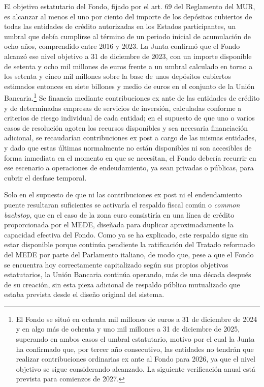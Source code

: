 \documentclass[10pt,a4paper]{article}
\begin{document}
{El objetivo estatutario del Fondo, fijado por el art. $69$ del Reglamento del MUR, es alcanzar al menos el uno por ciento del importe de los depósitos cubiertos de todas las entidades de crédito autorizadas en los Estados participantes, un umbral que debía cumplirse al término de un periodo inicial de acumulación de ocho años, comprendido entre 2016 y 2023. La Junta confirmó que el Fondo alcanzó ese nivel objetivo a 31 de diciembre de 2023, con un importe disponible de setenta y ocho mil millones de euros frente a un umbral calculado en torno a los setenta y cinco mil millones sobre la base de unos depósitos cubiertos estimados entonces en siete billones y medio de euros en el conjunto de la Unión Bancaria.\footnote{%
    El Fondo se situó en ochenta mil millones de euros a 31 de diciembre de 2024 y en algo más de ochenta y uno mil millones a 31 de diciembre de 2025, superando en ambos casos el umbral estatutario, motivo por el cual la Junta ha confirmado que, por tercer año consecutivo, las entidades no tendrán que realizar contribuciones ordinarias ex ante al Fondo para 2026, ya que el nivel objetivo se sigue considerando alcanzado. La siguiente verificación anual está prevista para comienzos de 2027.
} Se financia mediante contribuciones ex ante de las entidades de crédito y de determinadas empresas de servicios de inversión, calculadas conforme a criterios de riesgo individual de cada entidad; en el supuesto de que uno o varios casos de resolución agoten los recursos disponibles y sea necesaria financiación adicional, se recaudarían contribuciones ex post a cargo de las mismas entidades, y dado que estas últimas normalmente no están disponibles ni son accesibles de forma inmediata en el momento en que se necesitan, el Fondo debería recurrir en ese escenario a operaciones de endeudamiento, ya sean privadas o públicas, para cubrir el desfase temporal.

Solo en el supuesto de que ni las contribuciones ex post ni el endeudamiento puente resultaran suficientes se activaría el respaldo fiscal común o \textit{common backstop}, que en el caso de la zona euro consistiría en una línea de crédito proporcionada por el MEDE, diseñada para duplicar aproximadamente la capacidad efectiva del Fondo. Como ya se ha explicado, este respaldo sigue sin estar disponible porque continúa pendiente la ratificación del Tratado reformado del MEDE por parte del Parlamento italiano, de modo que, pese a que el Fondo se encuentra hoy correctamente capitalizado según sus propios objetivos estatutarios, la Unión Bancaria continúa operando, más de una década después de su creación, sin esta pieza adicional de respaldo público mutualizado que estaba prevista desde el diseño original del sistema.

}
\end{document}
